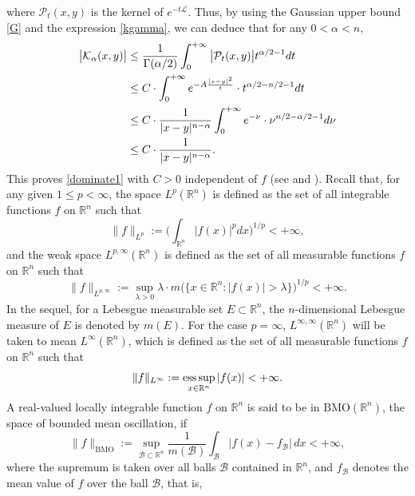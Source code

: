\documentclass[10pt, reqno]{amsart}
\theoremstyle{definition}
\theoremstyle{remark}
\numberwithin{equation}{section}
\begin{document}
where $\mathcal{P}_t(x,y)$ is the kernel of $e^{-t\mathcal L}$. Thus, by using the Gaussian upper bound \eqref{G} and the expression \eqref{kgamma}, we can deduce that for any $0<\alpha<n$,
\begin{align}\label{kernelk}
\big|\mathcal K_{\alpha}(x,y)\big|
&\leq\frac{1}{\Gamma(\alpha/2)}\int_0^{+\infty}\big|\mathcal{P}_t(x,y)\big|t^{\alpha/2-1}dt\notag\\
&\leq C\cdot\int_0^{+\infty} e^{-A\frac{|x-y|^2}{t}}\cdot t^{\alpha/2-n/2-1}dt\notag\\
&\leq C\cdot\frac{1}{|x-y|^{n-\alpha}}\int_0^{+\infty} e^{-\nu}\cdot\nu^{n/2-\alpha/2-1}d\nu\notag\\
&\leq C\cdot\frac{1}{|x-y|^{n-\alpha}}.
\end{align}
This proves \eqref{dominate1} with $C>0$ independent of $f$ (see \cite{duong1} and \cite{mo}). Recall that, for any given $1\leq p<\infty$, the space $L^p(\mathbb R^n)$ is defined as the set of all integrable functions $f$ on $\mathbb R^n$ such that
\begin{equation*}
\|f\|_{L^p}:=\bigg(\int_{\mathbb R^n}|f(x)|^pdx\bigg)^{1/p}<+\infty,
\end{equation*}
and the weak space $L^{p,\infty}(\mathbb R^n)$ is defined as the set of all measurable functions $f$ on $\mathbb R^n$ such that
\begin{equation*}
\|f\|_{L^{p,\infty}}:=\sup_{\lambda>0}\lambda\cdot m\big(\big\{x\in\mathbb R^n:|f(x)|>\lambda\big\}\big)^{1/p}<+\infty.
\end{equation*}
In the sequel, for a Lebesgue measurable set $E\subset\mathbb R^n$, the $n$-dimensional Lebesgue measure of $E$ is denoted by $m(E)$. For the case $p=\infty$, $L^{\infty,\infty}(\mathbb R^n)$ will be taken to mean $L^\infty(\mathbb R^n)$, which is defined as the set of all measurable functions $f$ on $\mathbb R^n$ such that
\begin{equation*}
\|f\|_{L^\infty}:=\underset{x\in\mathbb R^n}{\mbox{ess\,sup}}\,|f(x)|<+\infty.
\end{equation*}
A real-valued locally integrable function $f$ on $\mathbb R^n$ is said to be in $\mathrm{BMO}(\mathbb R^n)$, the space of bounded mean oscillation, if
\begin{equation}\label{bmonorm}
\|f\|_{\mathrm{BMO}}:=\sup_{\mathcal{B}\subset\mathbb R^n}\frac{1}{m(\mathcal{B})}\int_{\mathcal{B}}|f(x)-f_{\mathcal{B}}|\,dx<+\infty,
\end{equation}
where the supremum is taken over all balls $\mathcal{B}$ contained in $\mathbb R^n$, and $f_{\mathcal{B}}$ denotes the mean value of $f$ over the ball $\mathcal{B}$, that is,
\end{document}
